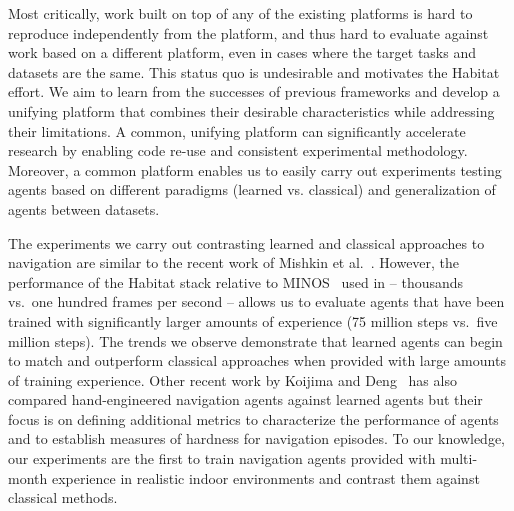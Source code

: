Most critically, work built on top of any of the existing platforms is hard to reproduce independently from the platform, and thus hard to evaluate against work based on a different platform, even in cases where the target tasks and datasets are the same.
This status quo is undesirable and motivates the Habitat effort.
We aim to learn from the successes of previous frameworks and develop a unifying platform that combines their desirable characteristics while addressing their limitations.
A common, unifying platform can significantly accelerate research by enabling code re-use and consistent experimental methodology.
Moreover, a common platform enables us to easily carry out experiments testing agents based on different paradigms (learned vs. classical) and generalization of agents between datasets.

The experiments we carry out contrasting learned and classical approaches to navigation are similar to the recent work of Mishkin et al.~\cite{mishkin2019benchmarking}.
However, the performance of the Habitat stack relative to MINOS~\cite{Savva2017} used in 
\cite{mishkin2019benchmarking} -- thousands vs.~one hundred frames per second -- 
allows us to evaluate agents that have been trained with significantly larger amounts of 
experience (75 million steps vs.~five million steps). 
The trends we observe demonstrate that learned agents can begin to match and outperform classical approaches when provided with large amounts of training experience.
Other recent work by Koijima and Deng~\cite{kojima2019learn} has also compared hand-engineered navigation agents against learned agents but their focus is on defining additional metrics to characterize the performance of agents and to establish measures of hardness for navigation episodes.
To our knowledge, our experiments are the first to train navigation agents provided with multi-month experience in realistic indoor environments and contrast them against classical methods.
